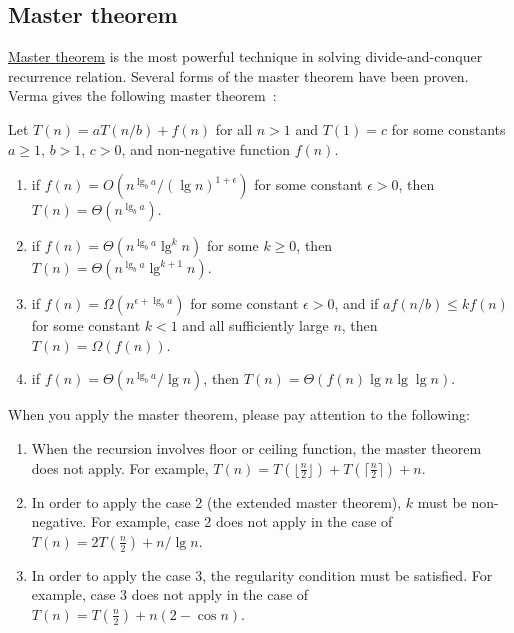\subsection{Master theorem}
\href{https://en.wikipedia.org/wiki/Master_theorem}{Master theorem} is the most powerful technique in solving divide-and-conquer recurrence relation.
Several forms of the master theorem have been proven. Verma gives the following master theorem~\cite{Verma1994}:
\begin{theorem}
Let $T(n) = aT(n / b) + f(n)$ for all $n > 1$ and $T(1) = c$ for some constants $a \geq 1$, $b > 1$, $c > 0$, and non-negative function $f(n)$.
\begin{enumerate}
\item if $f(n) = O(n^{\lg_b a} / (\lg n)^{1 + \epsilon})$ for some constant $\epsilon > 0$, then $T(n) = \Theta(n^{\lg_b a})$.
\item if $f(n) = \Theta(n^{\lg_b a} \lg^k n)$ for some $k \geq 0$, then $T(n) = \Theta(n^{\lg_b a} \lg^{k+1} n)$.
\item if $f(n) = \Omega(n^{\epsilon + \lg_b a})$ for some constant $\epsilon > 0$, and if $af(n/b) \leq kf(n)$ for some constant $k < 1$ and all sufficiently large $n$, then $T(n) = \Omega(f(n))$.
\item if $f(n) = \Theta(n^{\lg_b a} / \lg n)$, then $T(n) = \Theta(f(n) \lg n \lg \lg n)$.
\end{enumerate}
\end{theorem}

\begin{remark} When you apply the master theorem, please pay attention to the following:
\begin{enumerate}
\item When the recursion involves floor or ceiling function, the master theorem does not apply. For example, $T(n) = T(\lfloor \frac{n}{2} \rfloor) + T(\lceil \frac{n}{2} \rceil) + n$. 
\item In order to apply the case 2 (the extended master theorem), $k$ must be non-negative. For example, case 2 does not apply in the case of $T(n) = 2T(\frac{n}{2}) + n/ \lg n$.
\item In order to apply the case 3, the regularity condition must be satisfied. For example, case 3 does not apply in the case of $T(n) = T(\frac{n}{2}) + n(2 - \cos n)$.
\end{enumerate}
\end{remark}

